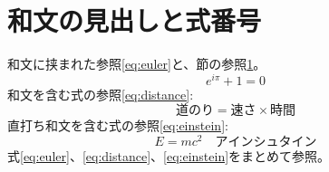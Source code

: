 \documentclass[pdflatex]{jlreq}
\begin{document}
\section{和文の見出しと式番号}\label{sec:top}
和文に挟まれた参照\eqref{eq:euler}と、節の参照\ref{sec:top}。
\begin{equation}
e^{i\pi}+1=0 \label{eq:euler}
\end{equation}
和文を含む式の参照\eqref{eq:distance}:
\begin{equation}
\text{道のり} = \text{速さ} \times \text{時間} \label{eq:distance}
\end{equation}
直打ち和文を含む式の参照\eqref{eq:einstein}:
\begin{equation}
E = mc^2 \quad アインシュタイン \label{eq:einstein}
\end{equation}
式\eqref{eq:euler}、\eqref{eq:distance}、\eqref{eq:einstein}をまとめて参照。
\end{document}
